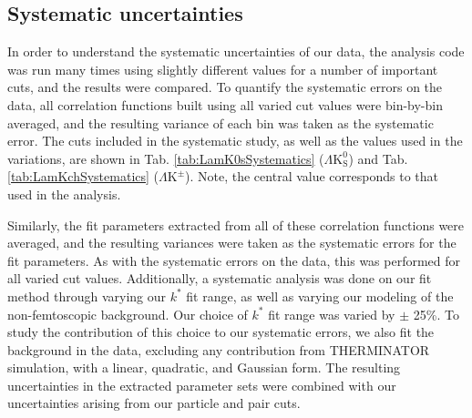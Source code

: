 \documentclass[ALICE,manyauthors]{cernphprep}
\newcommand{\kstar}{$k^{*}$\xspace}
\newcommand{\LamKpm}{$\Lambda\mathrm{K^{\pm}}$\xspace}
\newcommand{\LamKs}{$\Lambda\mathrm{K^{0}_{S}}$\xspace}
\begin{document}
\subsection{Systematic uncertainties}
\label{SysErrs}

In order to understand the systematic uncertainties of our data, the analysis code was run many times using slightly different values for a number of important cuts, and the results were compared.  
To quantify the systematic errors on the data, all correlation functions built using all varied cut values were bin-by-bin averaged, and the resulting variance of each bin was taken as the systematic error.  
The cuts included in the systematic study, as well as the values used in the variations, are shown in Tab. \ref{tab:LamK0sSystematics} (\LamKs) and Tab. \ref{tab:LamKchSystematics} (\LamKpm).  
Note, the central value corresponds to that used in the analysis.

Similarly, the fit parameters extracted from all of these correlation functions were averaged, and the resulting variances were taken as the systematic errors for the fit parameters.
As with the systematic errors on the data, this was performed for all varied cut values.
Additionally, a systematic analysis was done on our fit method through varying our \kstar fit range, as well as varying our modeling of the non-femtoscopic background.
Our choice of \kstar fit range was varied by $\pm$ 25\%. 
To study the contribution of this choice to our systematic errors, we also fit the background in the data, excluding any contribution from THERMINATOR simulation, with a linear, quadratic, and Gaussian form. 
The resulting uncertainties in the extracted parameter sets were combined with our uncertainties arising from our particle and pair cuts.
\end{document}
